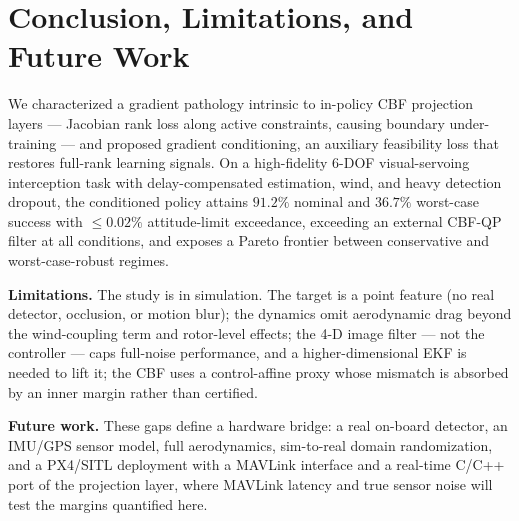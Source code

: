 \documentclass[journal]{IEEEtran}
\begin{document}
\section{Conclusion, Limitations, and Future Work}
We characterized a gradient pathology intrinsic to in-policy CBF projection
layers --- Jacobian rank loss along active constraints, causing
boundary under-training --- and proposed gradient conditioning, an auxiliary
feasibility loss that restores full-rank learning signals. On a high-fidelity
6-DOF visual-servoing interception task with delay-compensated estimation,
wind, and heavy detection dropout, the conditioned policy attains $91.2\%$
nominal and $36.7\%$ worst-case success with $\le0.02\%$ attitude-limit
exceedance, exceeding an external CBF-QP filter at all conditions, and exposes
a Pareto frontier between conservative and worst-case-robust regimes.

\textbf{Limitations.} The study is in simulation. The target is a point
feature (no real detector, occlusion, or motion blur); the dynamics omit
aerodynamic drag beyond the wind-coupling term and rotor-level effects; the
4-D image filter --- not the controller --- caps full-noise performance, and a
higher-dimensional EKF is needed to lift it; the CBF uses a control-affine
proxy whose mismatch is absorbed by an inner margin rather than certified.

\textbf{Future work.} These gaps define a hardware bridge: a real on-board
detector, an IMU/GPS sensor model, full aerodynamics, sim-to-real domain
randomization, and a PX4/SITL deployment with a MAVLink interface and a
real-time C/C++ port of the projection layer, where MAVLink latency and true
sensor noise will test the margins quantified here.



\end{document}
